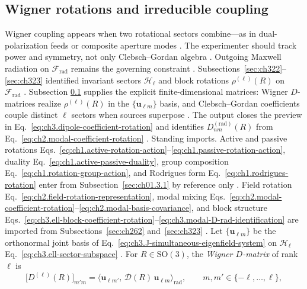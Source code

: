 \subsection{Wigner rotations and irreducible coupling}
\label{sec:ch324}
Wigner coupling appears when two rotational sectors combine---as in dual-polarization feeds or composite aperture modes \cite{stratton1941}. The experimenter should track power and symmetry, not only Clebsch--Gordan algebra \cite{jackson1999}. Outgoing Maxwell radiation on $\mathcal{F}_{\mathrm{rad}}$ remains the governing constraint \cite{stratton1941}.
Subsections~\ref{sec:ch322}--\ref{sec:ch323} identified invariant sectors \(\mathcal{H}_{\ell}\) and block
rotations \(\rho^{(\ell)}(R)\) on \(\mathcal{F}_{\mathrm{rad}}\) \cite{jackson1999}. Subsection
\ref{sec:ch324} supplies the explicit finite-dimensional matrices: Wigner \(D\)-matrices realize
\(\rho^{(\ell)}(R)\) in the \(\{\mathbf{u}_{\ell m}\}\) basis, and Clebsch--Gordan coefficients couple
distinct \(\ell\) sectors when sources superpose \cite{jackson1999}. The output closes
the preview in Eq.~\eqref{eq:ch3.dipole-coefficient-rotation} and identifies
\(D^{(\mathrm{rad})}_{nm}(R)\) from Eq.~\eqref{eq:ch2.modal-coefficient-rotation}
\cite{stratton1941}.
Standing imports. Active and passive rotations Eqs.~\eqref{eq:ch1.active-rotation-action}--\eqref{eq:ch1.passive-rotation-action},
duality Eq.~\eqref{eq:ch1.active-passive-duality}, group composition
Eq.~\eqref{eq:ch1.rotation-group-action}, and Rodrigues form Eq.~\eqref{eq:ch1.rodrigues-rotation} enter from
Subsection~\ref{sec:ch01.3.1} by reference only \cite{stratton1941}. Field rotation
Eq.~\eqref{eq:ch2.field-rotation-representation}, modal mixing
Eqs.~\eqref{eq:ch2.modal-coefficient-rotation}--\eqref{eq:ch2.modal-basis-covariance}, and block structure
Eqs.~\eqref{eq:ch3.ell-block-coefficient-rotation}--\eqref{eq:ch3.modal-D-rad-identification} are imported
from Subsections~\ref{sec:ch262} and~\ref{sec:ch323} \cite{stratton1941}.
Let \(\{\mathbf{u}_{\ell m}\}\) be the orthonormal joint basis of
Eq.~\eqref{eq:ch3.J-simultaneous-eigenfield-system} on \(\mathcal{H}_{\ell}\)
Eq.~\eqref{eq:ch3.ell-sector-subspace} \cite{jackson1999}. For \(R\in\mathrm{SO}(3)\), the
\emph{Wigner \(D\)-matrix} of rank \(\ell\) is
\begin{equation}
\label{eq:ch3.Wigner-D-matrix-def}
\big[D^{(\ell)}(R)\big]_{m'm}
=
\langle \mathbf{u}_{\ell m'},\,\mathcal{D}(R)\,\mathbf{u}_{\ell m}\rangle_{\mathrm{rad}},
\qquad
m,m'\in\{-\ell,\ldots,\ell\},
\end{equation}
